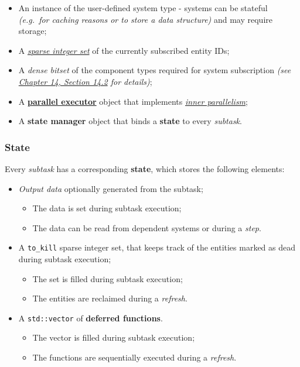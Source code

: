 \documentclass[twoside, 12pt, a4paper, openright]{book}
\begin{document}
\begin{itemize}
\item
  An instance of the user-defined system type - systems can be stateful
  \emph{(e.g.~for caching reasons or to store a data structure)} and may
  require storage;
\item
  A \protect\hyperlink{appendix_sparse_integer_sets}{\emph{sparse
  integer set}} of the currently subscribed entity IDs;
\item
  A \emph{dense bitset} of the component types required for system
  subscription \emph{(see
  \protect\hyperlink{appendix_component_bitset_creation}{Chapter 14,
  Section 14.2} for details)};
\item
  A \protect\hyperlink{multithreading_par_executor}{\textbf{parallel
  executor}} object that implements
  \protect\hyperlink{multithreading_inner_par}{\emph{inner
  parallelism}};
\item
  A \textbf{state manager} object that binds a \textbf{state} to every
  \emph{subtask}.
\end{itemize}

\hypertarget{storage_state}{\subsubsection{State}\label{storage_state}}

Every \emph{subtask} has a corresponding \textbf{state}, which stores
the following elements:

\begin{itemize}
\item
  \emph{Output data} optionally generated from the subtask;

  \begin{itemize}
  \item
    The data is set during subtask execution;
  \item
    The data can be read from dependent systems or during a \emph{step}.
  \end{itemize}
\item
  A
  \texttt{to_kill}
  sparse integer set, that keeps track of the entities marked as dead
  during subtask execution;

  \begin{itemize}
  \item
    The set is filled during subtask execution;
  \item
    The entities are reclaimed during a \emph{refresh}.
  \end{itemize}
\item
  A
  \texttt{std::vector}
  of \textbf{deferred functions}.

  \begin{itemize}
  \item
    The vector is filled during subtask execution;
  \item
    The functions are sequentially executed during a \emph{refresh}.
  \end{itemize}
\end{itemize}
\end{document}
